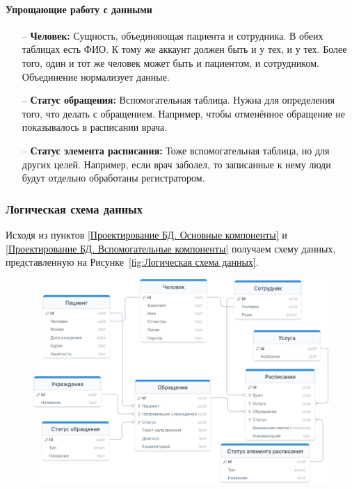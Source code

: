 \documentclass[a4paper,article]{article}
\begin{document}
\begin{sloppypar}
    \paragraph{Упрощающие работу с данными}\label{Проектирование БД. Вспомогательные компоненты. Упрощающие работу с данными}

    \begin{itemize}[nolistsep]
        \item[--] \textbf{Человек:} Сущность, объединяющая пациента и сотрудника. В обеих таблицах есть ФИО. К тому же аккаунт должен быть и у тех, и у тех. Более того, один и тот же человек может быть и пациентом, и сотрудником. Объединение нормализует данные.
        \item[--] \textbf{Статус обращения:} Вспомогательная таблица. Нужна для определения того, что делать с обращением. Например, чтобы отменённое обращение не показывалось в расписании врача.
        \item[--] \textbf{Статус элемента расписания:} Тоже вспомогательная таблица, но для других целей. Например, если врач заболел, то записанные к нему люди будут отдельно обработаны регистратором.
    \end{itemize}

    \subsubsection{Логическая схема данных}

    Исходя из пунктов \ref{Проектирование БД. Основные компоненты} и \ref{Проектирование БД. Вспомогательные компоненты} получаем схему данных, представленную на Рисунке~\ref{fig:Логическая схема данных}.

    \begin{figure}[h]

        \centering

        \includegraphics[width=0.9\linewidth]{Логическая схема данных.png}


\end{figure}
\end{sloppypar}
\end{document}
